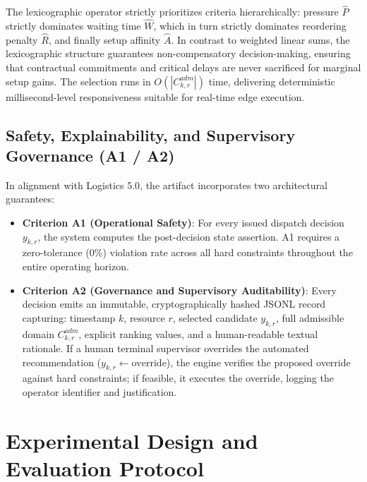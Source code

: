 \documentclass[11pt,a4paper]{article}
\begin{document}
The lexicographic operator strictly prioritizes criteria hierarchically: pressure $\hat{P}$ strictly dominates waiting time $\hat{W}$, which in turn strictly dominates reordering penalty $\hat{R}$, and finally setup affinity $\hat{A}$. In contrast to weighted linear sums, the lexicographic structure guarantees non-compensatory decision-making, ensuring that contractual commitments and critical delays are never sacrificed for marginal setup gains. The selection runs in $O(|C^{adm}_{k,r}|)$ time, delivering deterministic millisecond-level responsiveness suitable for real-time edge execution.

\subsection{Safety, Explainability, and Supervisory Governance (A1 / A2)}
In alignment with Logistics 5.0, the artifact incorporates two architectural guarantees:
\begin{itemize}[leftmargin=1.2cm,itemsep=0pt,topsep=2pt]
  \item \textbf{Criterion A1 (Operational Safety)}: For every issued dispatch decision $y_{k,r}$, the system computes the post-decision state assertion. A1 requires a zero-tolerance ($0\%$) violation rate across all hard constraints throughout the entire operating horizon.
  \item \textbf{Criterion A2 (Governance and Supervisory Auditability)}: Every decision emits an immutable, cryptographically hashed JSONL record capturing: timestamp $k$, resource $r$, selected candidate $y_{k,r}$, full admissible domain $C^{adm}_{k,r}$, explicit ranking values, and a human-readable textual rationale. If a human terminal supervisor overrides the automated recommendation ($y_{k,r} \leftarrow \text{override}$), the engine verifies the proposed override against hard constraints; if feasible, it executes the override, logging the operator identifier and justification.
\end{itemize}

\section{Experimental Design and Evaluation Protocol}
\label{sec:protocol}
\end{document}

